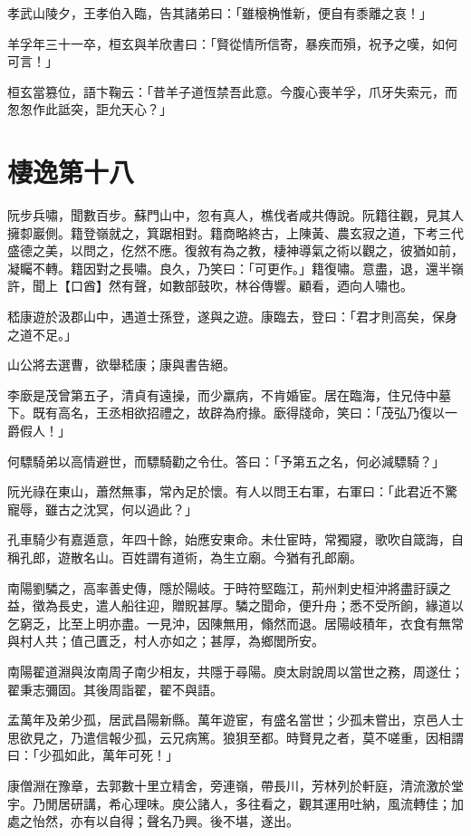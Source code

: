 孝武山陵夕，王孝伯入臨，告其諸弟曰：「雖榱桷惟新，便自有黍離之哀！」

羊孚年三十一卒，桓玄與羊欣書曰：「賢從情所信寄，暴疾而殞，祝予之嘆，如何可言！」

桓玄當篡位，語卞鞠云：「昔羊子道恆禁吾此意。今腹心喪羊孚，爪牙失索元，而怱怱作此詆突，詎允天心？」



\chapter{棲逸第十八}

阮步兵嘯，聞數百步。蘇門山中，忽有真人，樵伐者咸共傳說。阮籍往觀，見其人擁厀巖側。籍登嶺就之，箕踞相對。籍商略終古，上陳黃、農玄寂之道，下考三代盛德之美，以問之，仡然不應。復敘有為之教，棲神導氣之術以觀之，彼猶如前，凝矚不轉。籍因對之長嘯。良久，乃笑曰：「可更作。」籍復嘯。意盡，退，還半嶺許，聞上【口酋】然有聲，如數部鼓吹，林谷傳響。顧看，迺向人嘯也。

嵇康遊於汲郡山中，遇道士孫登，遂與之遊。康臨去，登曰：「君才則高矣，保身之道不足。」

山公將去選曹，欲舉嵇康；康與書告絕。

李廞是茂曾第五子，清貞有遠操，而少羸病，不肯婚宦。居在臨海，住兄侍中墓下。既有高名，王丞相欲招禮之，故辟為府掾。廞得牋命，笑曰：「茂弘乃復以一爵假人！」

何驃騎弟以高情避世，而驃騎勸之令仕。答曰：「予第五之名，何必減驃騎？」

阮光祿在東山，蕭然無事，常內足於懷。有人以問王右軍，右軍曰：「此君近不驚寵辱，雖古之沈冥，何以過此？」

孔車騎少有嘉遁意，年四十餘，始應安東命。未仕宦時，常獨寢，歌吹自箴誨，自稱孔郎，遊散名山。百姓謂有道術，為生立廟。今猶有孔郎廟。

南陽劉驎之，高率善史傳，隱於陽岐。于時符堅臨江，荊州刺史桓沖將盡訏謨之益，徵為長史，遣人船往迎，贈貺甚厚。驎之聞命，便升舟；悉不受所餉，緣道以乞窮乏，比至上明亦盡。一見沖，因陳無用，翛然而退。居陽岐積年，衣食有無常與村人共；值己匱乏，村人亦如之；甚厚，為鄉閭所安。

南陽翟道淵與汝南周子南少相友，共隱于尋陽。庾太尉說周以當世之務，周遂仕；翟秉志彌固。其後周詣翟，翟不與語。

孟萬年及弟少孤，居武昌陽新縣。萬年遊宦，有盛名當世；少孤未嘗出，京邑人士思欲見之，乃遣信報少孤，云兄病篤。狼狽至都。時賢見之者，莫不嗟重，因相謂曰：「少孤如此，萬年可死！」

康僧淵在豫章，去郭數十里立精舍，旁連嶺，帶長川，芳林列於軒庭，清流激於堂宇。乃閒居研講，希心理味。庾公諸人，多往看之，觀其運用吐納，風流轉佳；加處之怡然，亦有以自得；聲名乃興。後不堪，遂出。

